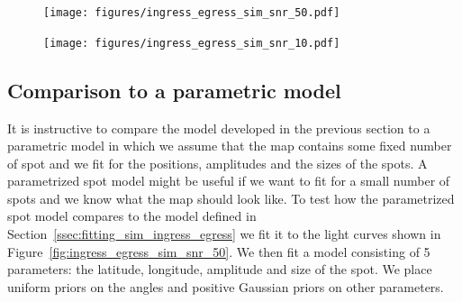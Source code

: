 \documentclass[modern]{aastex62}
\begin{document}
\begin{figure}[h!]
    \begin{centering}
    \texttt{[image: figures/ingress\_egress\_sim\_snr\_50.pdf]}
    \end{centering}
\end{figure}


\begin{figure}[h!]
    \begin{centering}
        \texttt{[image: figures/ingress\_egress\_sim\_snr\_10.pdf]}
    \end{centering}
\end{figure}

\subsection{Comparison to a parametric model}
It is instructive to compare the model developed in the previous section to a parametric model in which we assume that the map contains some fixed number of spot and we fit for the positions, amplitudes and the sizes of the spots.
A parametrized spot model might be useful if we want to fit for a small number of spots and we know what the map should look like.
To test how the parametrized spot model compares to the model defined in Section~\ref{ssec:fitting_sim_ingress_egress} we fit it to the light curves shown in Figure~\ref{fig:ingress_egress_sim_snr_50}. 
We then fit a model consisting of 5 parameters: the latitude, longitude, amplitude and size of the spot.
We place uniform priors on the angles and positive Gaussian priors on other parameters. 
\end{document}
